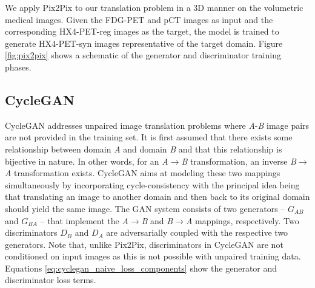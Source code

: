 We apply Pix2Pix to our translation problem in a 3D manner on the volumetric medical images. Given the FDG-PET and pCT images as input and the corresponding HX4-PET-reg images as the target, the model is trained to generate HX4-PET-syn images representative of the target domain. Figure \ref{fig:pix2pix} shows a schematic of the generator and discriminator training phases.


\subsection{CycleGAN}
\label{cyclegan}

CycleGAN addresses unpaired image translation problems where \textit{A}-\textit{B} image pairs are not provided in the training set. It is first assumed that there exists some relationship between domain \textit{A} and domain \textit{B} and that this relationship is bijective in nature. In other words, for an \textit{A}$\rightarrow$\textit{B} transformation, an inverse \textit{B}$\rightarrow$\textit{A} transformation exists. CycleGAN aims at modeling these two mappings simultaneously by incorporating cycle-consistency with the principal idea being that translating an image to another domain and then back to its original domain should yield the same image.  The GAN system consists of two generators -- $G_{AB}$ and $G_{BA}$ -- that implement the \textit{A}$\rightarrow$\textit{B} and \textit{B}$\rightarrow$\textit{A} mappings, respectively. Two discriminators $D_B$ and $D_A$ are adversarially coupled with the respective two generators. Note that, unlike Pix2Pix, discriminators in CycleGAN are not conditioned on input images as this is not possible with unpaired training data. Equations \ref{eq:cyclegan_naive_loss_components} show the generator and discriminator loss terms.

